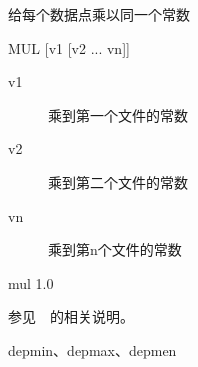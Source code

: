 \label{cmd:mul}

给每个数据点乘以同一个常数

\begin{SACSTX}
MUL [v1 [v2 ... vn]]
\end{SACSTX}

\begin{description}
\item [v1] 乘到第一个文件的常数
\item [v2] 乘到第二个文件的常数
\item [vn] 乘到第n个文件的常数
\end{description}

\begin{SACDFT}
mul 1.0
\end{SACDFT}

参见~~的相关说明。

depmin、depmax、depmen
